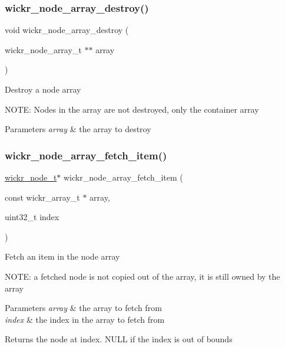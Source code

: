 \subsubsection{\texorpdfstring{wickr\+\_\+node\+\_\+array\+\_\+destroy()}{wickr\_node\_array\_destroy()}}
{\footnotesize\ttfamily void wickr\+\_\+node\+\_\+array\+\_\+destroy (\begin{DoxyParamCaption}\item[{wickr\+\_\+node\+\_\+array\+\_\+t $\ast$$\ast$}]{array }\end{DoxyParamCaption})}

Destroy a node array

N\+O\+TE\+: Nodes in the array are not destroyed, only the container array


\begin{DoxyParams}{Parameters}
{\em array} & the array to destroy \\
\hline
\end{DoxyParams}
\mbox{\label{group__wickr__node_ga878a3015abc8563d512c0e5acf10df60}} 
\subsubsection{\texorpdfstring{wickr\+\_\+node\+\_\+array\+\_\+fetch\+\_\+item()}{wickr\_node\_array\_fetch\_item()}}
{\footnotesize\ttfamily \hyperlink{structwickr__node}{wickr\+\_\+node\+\_\+t}$\ast$ wickr\+\_\+node\+\_\+array\+\_\+fetch\+\_\+item (\begin{DoxyParamCaption}\item[{const wickr\+\_\+array\+\_\+t $\ast$}]{array,  }\item[{uint32\+\_\+t}]{index }\end{DoxyParamCaption})}

Fetch an item in the node array

N\+O\+TE\+: a fetched node is not copied out of the array, it is still owned by the array


\begin{DoxyParams}{Parameters}
{\em array} & the array to fetch from \\
\hline
{\em index} & the index in the array to fetch from \\
\hline
\end{DoxyParams}
\begin{DoxyReturn}{Returns}
the node at \textquotesingle{}index\textquotesingle{}. N\+U\+LL if the index is out of bounds 
\end{DoxyReturn}
\mbox{\label{group__wickr__node_ga504ebe707aa003032c4ac8044d73ee92}} 

